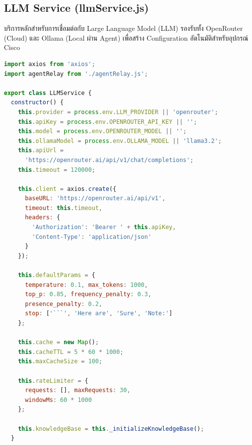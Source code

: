 \subsection{LLM Service (llmService.js)}
\hspace*{1.3em}
บริการหลักสำหรับการเชื่อมต่อกับ Large Language Model (LLM) รองรับทั้ง OpenRouter (Cloud) และ Ollama (Local ผ่าน Agent) เพื่อสร้าง Configuration อัตโนมัติสำหรับอุปกรณ์ Cisco

\begin{lstlisting}[language=JavaScript, caption={services/llmService.js -- LLM Service Class}]
import axios from 'axios';
import agentRelay from './agentRelay.js';

export class LLMService {
  constructor() {
    this.provider = process.env.LLM_PROVIDER || 'openrouter';
    this.apiKey = process.env.OPENROUTER_API_KEY || '';
    this.model = process.env.OPENROUTER_MODEL || '';
    this.ollamaModel = process.env.OLLAMA_MODEL || 'llama3.2';
    this.apiUrl =
      'https://openrouter.ai/api/v1/chat/completions';
    this.timeout = 120000;

    this.client = axios.create({
      baseURL: 'https://openrouter.ai/api/v1',
      timeout: this.timeout,
      headers: {
        'Authorization': 'Bearer ' + this.apiKey,
        'Content-Type': 'application/json'
      }
    });

    this.defaultParams = {
      temperature: 0.1, max_tokens: 1000,
      top_p: 0.85, frequency_penalty: 0.3,
      presence_penalty: 0.2,
      stop: ['```', 'Here are', 'Sure', 'Note:']
    };

    this.cache = new Map();
    this.cacheTTL = 5 * 60 * 1000;
    this.maxCacheSize = 100;

    this.rateLimiter = {
      requests: [], maxRequests: 30,
      windowMs: 60 * 1000
    };

    this.knowledgeBase = this._initializeKnowledgeBase();
  }
\end{lstlisting}

